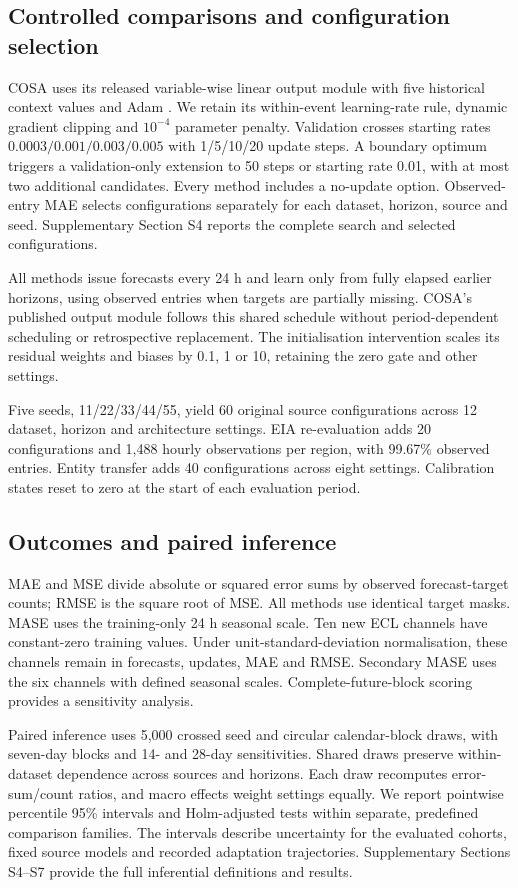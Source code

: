 \documentclass[preprint,12pt,times,nonatbib]{elsarticle}
\begin{document}
\subsection{Controlled comparisons and configuration selection}
COSA uses its released variable-wise linear output module with five historical context values and Adam \parencite{im2026cosa}. We retain its within-event learning-rate rule, dynamic gradient clipping and $10^{-4}$ parameter penalty. Validation crosses starting rates $0.0003/0.001/0.003/0.005$ with 1/5/10/20 update steps. A boundary optimum triggers a validation-only extension to 50 steps or starting rate 0.01, with at most two additional candidates. Every method includes a no-update option. Observed-entry MAE selects configurations separately for each dataset, horizon, source and seed. Supplementary Section S4 reports the complete search and selected configurations.

All methods issue forecasts every 24 h and learn only from fully elapsed earlier horizons, using observed entries when targets are partially missing. COSA's published output module follows this shared schedule without period-dependent scheduling or retrospective replacement. The initialisation intervention scales its residual weights and biases by 0.1, 1 or 10, retaining the zero gate and other settings.

Five seeds, 11/22/33/44/55, yield 60 original source configurations across 12 dataset, horizon and architecture settings. EIA re-evaluation adds 20 configurations and 1,488 hourly observations per region, with 99.67\% observed entries. Entity transfer adds 40 configurations across eight settings. Calibration states reset to zero at the start of each evaluation period.

\subsection{Outcomes and paired inference}
MAE and MSE divide absolute or squared error sums by observed forecast-target counts; RMSE is the square root of MSE. All methods use identical target masks. MASE uses the training-only 24 h seasonal scale. Ten new ECL channels have constant-zero training values. Under unit-standard-deviation normalisation, these channels remain in forecasts, updates, MAE and RMSE. Secondary MASE uses the six channels with defined seasonal scales. Complete-future-block scoring provides a sensitivity analysis.

Paired inference uses 5,000 crossed seed and circular calendar-block draws, with seven-day blocks and 14- and 28-day sensitivities. Shared draws preserve within-dataset dependence across sources and horizons. Each draw recomputes error-sum/count ratios, and macro effects weight settings equally. We report pointwise percentile 95\% intervals and Holm-adjusted tests within separate, predefined comparison families. The intervals describe uncertainty for the evaluated cohorts, fixed source models and recorded adaptation trajectories. Supplementary Sections S4--S7 provide the full inferential definitions and results.
\end{document}

